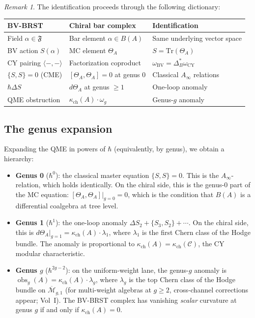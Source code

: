 \documentclass[11pt]{amsart}
\theoremstyle{plain}
\theoremstyle{definition}
\theoremstyle{remark}
\newtheorem{remark}[theorem]{Remark}
\newcommand{\Ainf}{A_\infty}
\newcommand{\Tr}{\mathrm{Tr}}
\newcommand{\BV}{\mathrm{BV}}
\newcommand{\cC}{\mathcal{C}}
\newcommand{\cM}{\mathcal{M}}
\DeclareMathOperator{\obs}{obs}
\begin{document}
\begin{remark}
The identification proceeds through the following dictionary:
\begin{center}
\renewcommand{\arraystretch}{1.4}
\begin{tabular}{lll}
 \textbf{BV-BRST} & \textbf{Chiral bar complex} & \textbf{Identification} \\
 \hline
 Field $\alpha \in \mathfrak{F}$ & Bar element $\alpha \in B(A)$ & Same underlying vector space \\
 BV action $S(\alpha)$ & MC element $\Theta_A$ & $S = \Tr(\Theta_A)$ \\
 CY pairing $\langle -,- \rangle$ & Factorization coproduct & $\omega_{\BV} = \Delta_B^*\omega_{\mathrm{CY}}$ \\
 $\{S,S\} = 0$ (CME) & $[\Theta_A, \Theta_A] = 0$ at genus 0 & Classical $\Ainf$ relations \\
 $\hbar\Delta S$ & $d\Theta_A$ at genus $\geq 1$ & One-loop anomaly \\
 QME obstruction & $\kappa_{\mathrm{ch}}(A) \cdot \omega_g$ & Genus-$g$ anomaly
\end{tabular}
\end{center}
\end{remark}

\subsection{The genus expansion}
\label{subsec:genus-expansion}

Expanding the QME in powers of $\hbar$ (equivalently, by genus), we obtain a hierarchy:

\begin{itemize}
 \item \textbf{Genus 0} ($\hbar^0$): the classical master equation $\{S, S\} = 0$. This is the $\Ainf$-relation, which holds identically. On the chiral side, this is the genus-0 part of the MC equation: $[\Theta_A, \Theta_A]|_{g=0} = 0$, which is the condition that $B(A)$ is a differential coalgebra at tree level.

 \item \textbf{Genus 1} ($\hbar^1$): the one-loop anomaly $\Delta S_2 + \{S_3, S_2\} + \cdots$. On the chiral side, this is $d\Theta_A|_{g=1} = \kappa_{\mathrm{ch}}(A) \cdot \lambda_1$, where $\lambda_1$ is the first Chern class of the Hodge bundle. The anomaly is proportional to $\kappa_{\mathrm{ch}}(A) = \kappa_{\mathrm{ch}}(\cC)$, the CY modular characteristic.

 \item \textbf{Genus $g$} ($\hbar^{2g-2}$): on the uniform-weight lane, the genus-$g$ anomaly is $\obs_g(A) = \kappa_{\mathrm{ch}}(A) \cdot \lambda_g$, where $\lambda_g$ is the top Chern class of the Hodge bundle on $\overline{\cM}_{g,1}$ (for multi-weight algebras at $g \geq 2$, cross-channel corrections appear; Vol~I). The BV-BRST complex has vanishing \emph{scalar} curvature at genus $g$ if and only if $\kappa_{\mathrm{ch}}(A) = 0$.
\end{itemize}
\end{document}
